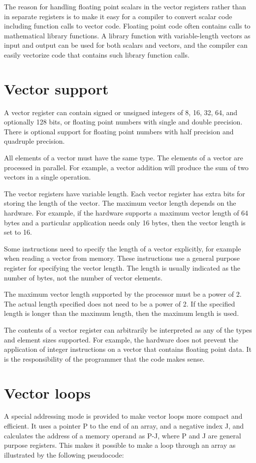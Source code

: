 \documentclass[forwardcom.tex]{subfiles}
\begin{document}
The reason for handling floating point scalars in the vector registers rather than in separate registers is to make it easy for a compiler to convert scalar code including function calls to vector code. Floating point code often contains calls to mathematical library functions. 
A library function with variable-length vectors as input and output can be used for both scalars and vectors, and the compiler can easily vectorize code that contains such library function calls.

\section{Vector support}
A vector register can contain signed or unsigned integers of 8, 16, 32, 64, and optionally 128 bits, or floating point numbers with single and double precision. There is optional support for floating point numbers with half precision and quadruple precision. 
\vv

All elements of a vector must have the same type. The elements of a vector are processed in parallel. For example, a vector addition will produce the sum of two vectors in a single operation.
\vv

The vector registers have variable length. Each vector register has extra bits for storing the length of the vector. The maximum vector length depends on the hardware. 
For example, if the hardware supports a maximum vector length of 64 bytes and a particular application needs only 16 bytes, then the vector length is set to 16.
\vv

Some instructions need to specify the length of a vector explicitly, for example when reading a vector from memory. These instructions use a general purpose register for specifying the vector length. The length is usually indicated as the number of bytes, not the number of vector elements.
\vv

The maximum vector length supported by the processor must be a power of 2. The actual length specified does not need to be a power of 2. If the specified length is longer than the maximum length, then the maximum length is used.
\vv

The contents of a vector register can arbitrarily be interpreted as any of the types and element sizes supported. For example, the hardware does not prevent the application of integer instructions on a vector that contains floating point data. It is the responsibility of the programmer that the code makes sense.

\section{Vector loops} \label{vectorLoops}
A special addressing mode is provided to make vector loops more compact and efficient. It uses a pointer P to the end of an array, and a negative index J, and calculates the address of a memory operand as P-J, where P and J are general purpose registers. This makes it possible to make a loop through an array as illustrated by the following pseudocode:
\vv
\end{document}
